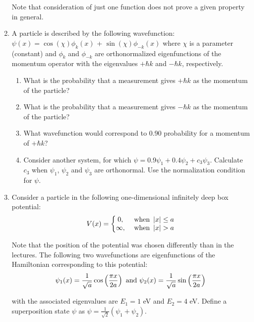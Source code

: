 \begin{enumerate}
Note that consideration of just one function does not prove a given property in general.


\item A particle is described by the following wavefunction: $\psi(x) = \cos(\chi)\phi_k(x)$ + $\sin(\chi)\phi_{-k}(x)$ where $\chi$ is a parameter (constant) and $\phi_k$ and $\phi_{-k}$ are orthonormalized eigenfunctions of the momentum operator with the eigenvalues $+\hbar k$ and $-\hbar k$, respectively.

\begin{enumerate}
\item What is the probability that a measurement gives $+\hbar k$ as the momentum of the particle?
\item What is the probability that a measurement gives $-\hbar k$ as the momentum of the particle?
\item What wavefunction would correspond to 0.90 probability for a momentum of $+\hbar k$?
\item Consider another system, for which $\psi = 0.9\psi_1 + 0.4\psi_2 + c_3\psi_3$. Calculate $c_3$ when $\psi_1$, $\psi_2$ and $\psi_3$ are orthonormal. Use the normalization condition for $\psi$.
\end{enumerate}


\item Consider a particle in the following one-dimensional infinitely deep box potential:
$$V(x) = \left\lbrace\begin{matrix}
0, & \textnormal{ when }\left|x\right| \le a\\
\infty, & \textnormal{ when }\left|x\right| > a\\
\end{matrix}\right.
$$

Note that the position of the potential was chosen differently than in the lectures. The following two wavefunctions are eigenfunctions of the Hamiltonian corresponding to this potential:
$$\psi_1(x) = \frac{1}{\sqrt{a}}\cos\left(\frac{\pi x}{2a}\right)\textnormal{ and } \psi_2(x) = \frac{1}{\sqrt{a}}\sin\left(\frac{\pi x}{2a}\right)$$

with the associated eigenvalues are $E_1 = 1$ eV and $E_2 = 4$ eV. Define a superposition state $\psi$ as $\psi = \frac{1}{\sqrt{2}}\left(\psi_1 + \psi_2\right)$.


\end{enumerate}
